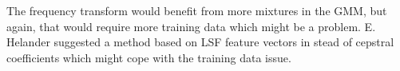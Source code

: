The frequency transform would benefit from more mixtures in the GMM, but again, that would require more training data which might be a problem. E. Helander \cite{helander08} suggested a method based on LSF feature vectors in stead of cepstral coefficients which might cope with the training data issue.


